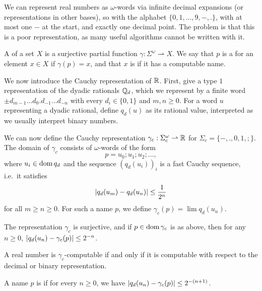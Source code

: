 
We can represent real numbers as $\omega$-words via infinite decimal expansions
(or representations in other bases), so with the alphabet $\{0,1, \ldots, 9, -,
.\}$, with at most one $-$ at the start, and exactly one decimal point.
The problem is that this is a poor representation, as many useful algorithms
cannot be written with it.

\begin{definition}
  A  of a set $X$ is a surjective partial function
  $\gamma: \Sigma^\omega \rightharpoonup X$.
  We say that $p$ is a  for an element $x \in X$ if $\gamma(p) = x$,
  and that $x$ is  if it has a computable name.
\end{definition}

We now introduce the Cauchy representation of $\mathbb{R}$.
First, give a type $1$ representation of the dyadic rationals $\mathbb{Q}_d$, which we
represent by a finite word $\pm d_{m-1} \ldots d_0 . d_{-1} \ldots d_{-n}$
with every $d_i \in \{0, 1\}$ and $m, n \ge 0$.
For a word $u$ representing a dyadic rational, define $q_d(u)$ as its rational
value, interpreted as we usually interpret binary numbers.

We can now define the Cauchy representation $\gamma_c: \Sigma_c^\omega
\rightharpoonup \mathbb{R}$ for $\Sigma_c = \{ -, ., 0, 1, ; \}$.
The domain of $\gamma_c$ consists of $\omega$-words of the form
\[
  p = u_0; u_1; u_2; \ldots,
\]
where $u_i \in \operatorname{dom} q_d$ and the sequence $(q_d(u_i))_i$ is a fast Cauchy
sequence, i.e.~it satisfies
\[
  \left| q_d(u_m) - q_d(u_n) \right| \le \frac{1}{2^n}
\]
for all $m \ge n \ge 0$.
For such a name $p$, we define $\gamma_c(p) = \lim q_d(u_n)$.

\begin{proposition}
  The representation $\gamma_c$ is surjective, and if $p \in \operatorname{dom} \gamma_c$ is
  as above, then for any $n \ge 0$, $\left| q_d(u_n) - \gamma_c(p) \right| \le 2^{-n}$.
\end{proposition}

\begin{proposition}
  A real number is $\gamma_c$-computable if and only if it is computable with
  respect to the decimal or binary representation.
\end{proposition}

\begin{definition}
  A name $p$ is  if for every $n \ge 0$, we have $\left| q_d(u_n) -
	\gamma_c(p) \right| \le 2^{-(n+1)}$.
\end{definition}


